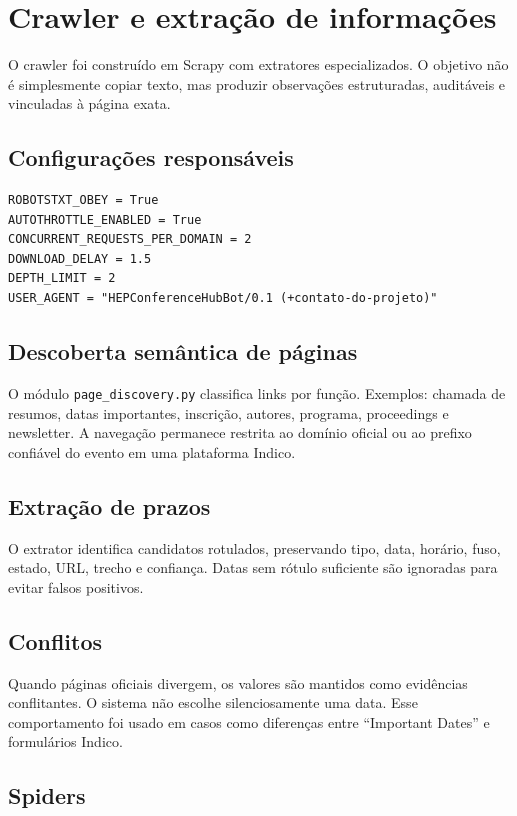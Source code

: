 \chapter{Crawler e extração de informações}

O crawler foi construído em Scrapy com extratores especializados. O objetivo não é simplesmente copiar texto, mas produzir observações estruturadas, auditáveis e vinculadas à página exata.

\section{Configurações responsáveis}

\begin{lstlisting}
ROBOTSTXT_OBEY = True
AUTOTHROTTLE_ENABLED = True
CONCURRENT_REQUESTS_PER_DOMAIN = 2
DOWNLOAD_DELAY = 1.5
DEPTH_LIMIT = 2
USER_AGENT = "HEPConferenceHubBot/0.1 (+contato-do-projeto)"
\end{lstlisting}

\section{Descoberta semântica de páginas}

O módulo \texttt{page\_discovery.py} classifica links por função. Exemplos: chamada de resumos, datas importantes, inscrição, autores, programa, proceedings e newsletter. A navegação permanece restrita ao domínio oficial ou ao prefixo confiável do evento em uma plataforma Indico.

\section{Extração de prazos}

O extrator identifica candidatos rotulados, preservando tipo, data, horário, fuso, estado, URL, trecho e confiança. Datas sem rótulo suficiente são ignoradas para evitar falsos positivos.

\section{Conflitos}

Quando páginas oficiais divergem, os valores são mantidos como evidências conflitantes. O sistema não escolhe silenciosamente uma data. Esse comportamento foi usado em casos como diferenças entre “Important Dates” e formulários Indico.

\section{Spiders}


